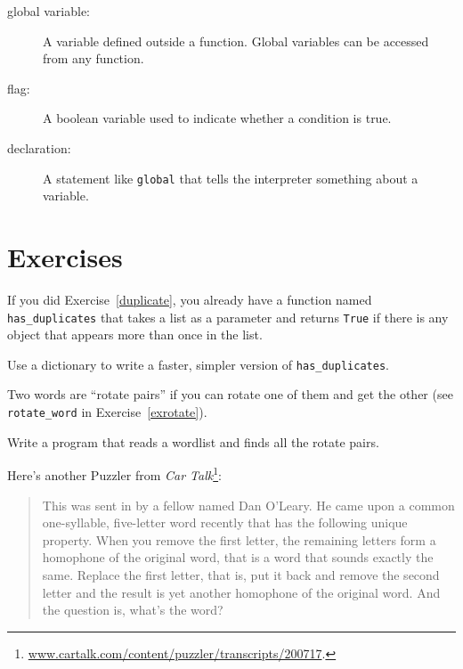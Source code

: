\documentclass[10pt]{book}
\begin{document}
{\begin{description}
\item[global variable:]  A variable defined outside a function.  Global
variables can be accessed from any function.

\item[flag:] A boolean variable used to indicate whether a condition
is true.

\item[declaration:] A statement like {\tt global} that tells the
interpreter something about a variable.

\end{description}

\section{Exercises}

\begin{ex}

If you did Exercise~\ref{duplicate}, you already have
a function named \verb"has_duplicates" that takes a list
as a parameter and returns {\tt True} if there is any object
that appears more than once in the list.

Use a dictionary to write a faster, simpler version of
\verb"has_duplicates".
\end{ex}


\begin{ex}
\label{exrotatepairs}


Two words are ``rotate pairs'' if you can rotate one of them
and get the other (see \verb"rotate_word" in Exercise~\ref{exrotate}).

Write a program that reads a wordlist and finds all the rotate
pairs.
\end{ex}


\begin{ex}

Here's another Puzzler from {\em Car
Talk}\footnote{\url{www.cartalk.com/content/puzzler/transcripts/200717}.}:

\begin{quote}
This was sent in by a fellow named Dan O'Leary. He came upon a common
one-syllable, five-letter word recently that has the following unique
property. When you remove the first letter, the remaining letters form
a homophone of the original word, that is a word that sounds exactly
the same. Replace the first letter, that is, put it back and remove
the second letter and the result is yet another homophone of the
original word. And the question is, what's the word?


\end{quote}
\end{ex}}
\end{document}
